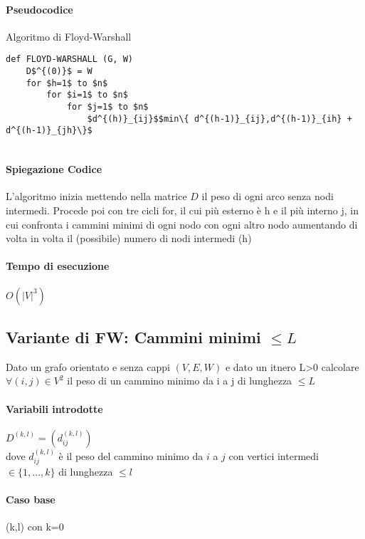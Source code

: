 \paragraph{Pseudocodice} Algoritmo di Floyd-Warshall

\begin{lstlisting}
def FLOYD-WARSHALL (G, W)
    D$^{(0)}$ = W
    for $h=1$ to $n$
        for $i=1$ to $n$
            for $j=1$ to $n$
                $d^{(h)}_{ij}$$min\{ d^{(h-1)}_{ij},d^{(h-1)}_{ih} + d^{(h-1)}_{jh}\}$


\end{lstlisting}

\paragraph{Spiegazione Codice}
L'algoritmo inizia mettendo nella matrice $D$ il peso di ogni arco senza nodi intermedi.
Procede poi con tre cicli for, il cui più esterno è h e il più interno j, in cui confronta i cammini minimi
di ogni nodo con ogni altro nodo aumentando di volta in volta il (possibile) numero di nodi intermedi (h)

\paragraph{Tempo di esecuzione}
\begin{center}
	$O(|V|^3)$
\end{center}

\subsection*{Variante di FW: Cammini minimi $\leq L$}

Dato un grafo orientato e senza cappi $(V,E,W)$ e dato un itnero L\textgreater0 calcolare
$\forall (i,j) \in V^2$ il peso di un cammino minimo da i a j di lunghezza $\leq L$

\paragraph{Variabili introdotte} $D^{(k,l)}= (d^{(k,l)}_{ij})$ \\
dove $d^{(k,l)}_{ij}$ è il peso del cammino minimo da $i$ a $j$
con vertici intermedi $\in \{1,...,k\}$ di lunghezza $\leq l$

\paragraph{Caso base} (k,l) con k=0

